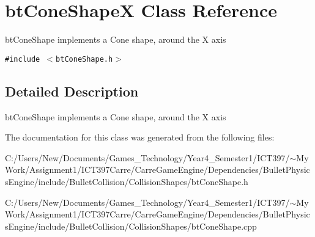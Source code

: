 \hypertarget{classbt_cone_shape_x}{
\section{btConeShapeX Class Reference}
\label{classbt_cone_shape_x}
}
btConeShape implements a Cone shape, around the X axis  


{\tt \#include $<$btConeShape.h$>$}



\subsection{Detailed Description}
btConeShape implements a Cone shape, around the X axis 

The documentation for this class was generated from the following files:\begin{CompactItemize}
\item 
C:/Users/New/Documents/Games\_\-Technology/Year4\_\-Semester1/ICT397/$\sim$My Work/Assignment1/ICT397Carre/CarreGameEngine/Dependencies/BulletPhysicsEngine/include/BulletCollision/CollisionShapes/btConeShape.h\item 
C:/Users/New/Documents/Games\_\-Technology/Year4\_\-Semester1/ICT397/$\sim$My Work/Assignment1/ICT397Carre/CarreGameEngine/Dependencies/BulletPhysicsEngine/include/BulletCollision/CollisionShapes/btConeShape.cpp\end{CompactItemize}

